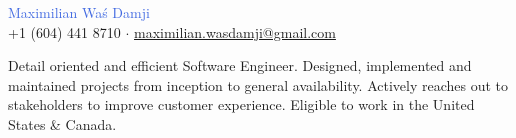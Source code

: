 \documentclass[11pt]{article}
\newcommand{\headinginline}[2]{
    \begin{minipage}[t]{0.55\textwidth}
    \vspace*{\fill}
    #1
    \end{minipage}
    \begin{minipage}[t]{0.45\textwidth}
    \begin{flushright}
    \vspace*{\fill}
    \vspace{8px}
    #2
    \end{flushright}
    \end{minipage}
}
\newcommand{\github}[1]{\href{https://github.com/#1/}{github.com/#1}}
\newcommand{\email}[1]{\href{mailto:#1}{#1}}
\newcommand{\linkedin}[1]{\href{https://www.linkedin.com/in/#1/}{#1}}
\begin{document}

\begin{flushright}
\end{flushright}

\begin{center}
    {
        \Huge
        \textcolor{RoyalBlue}{Maximilian Waś Damji} \\
    }
    \faPhone{}
    +1 (604) 441 8710 $\cdot$
    \faEnvelope{}
    \email{maximilian.wasdamji@gmail.com}
\end{center}

\begin{center}
Detail oriented and efficient Software Engineer. 
Designed, implemented and maintained projects from inception to general availability.
Actively reaches out to stakeholders to improve customer experience.
Eligible to work in the United States \& Canada.
\end{center}






\end{document}
